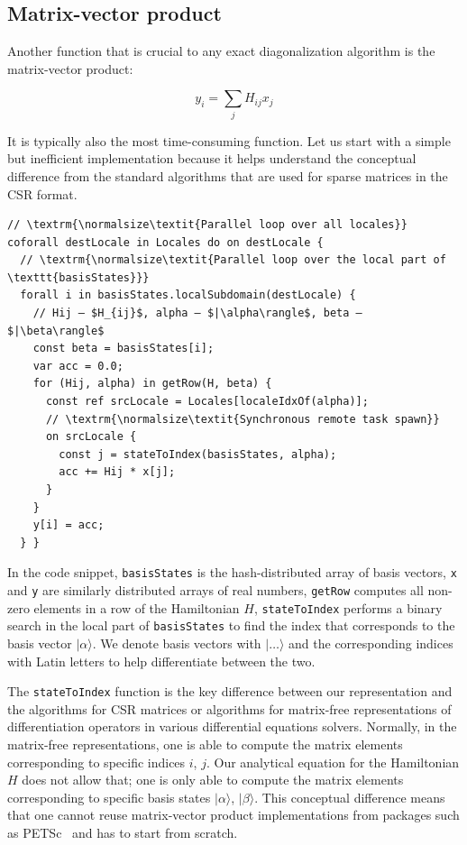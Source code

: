 \subsection{Matrix-vector product}\label{sec:ls23:matrix-vector-product}

Another function that is crucial to any exact diagonalization algorithm is the matrix-vector product:

\begin{equation*}
    y_i = \sum_{j} H_{ij} x_j
\end{equation*}

\noindent It is typically also the most time-consuming function. Let us start with a simple but inefficient implementation because it helps understand the conceptual difference from the standard algorithms that are used for sparse matrices in the CSR format.

\begin{verbatim}
// \textrm{\normalsize\textit{Parallel loop over all locales}}
coforall destLocale in Locales do on destLocale {
  // \textrm{\normalsize\textit{Parallel loop over the local part of \texttt{basisStates}}}
  forall i in basisStates.localSubdomain(destLocale) {
    // Hij — $H_{ij}$, alpha — $|\alpha\rangle$, beta — $|\beta\rangle$
    const beta = basisStates[i];
    var acc = 0.0;
    for (Hij, alpha) in getRow(H, beta) {
      const ref srcLocale = Locales[localeIdxOf(alpha)];
      // \textrm{\normalsize\textit{Synchronous remote task spawn}}
      on srcLocale {
        const j = stateToIndex(basisStates, alpha);
        acc += Hij * x[j];
      }
    }
    y[i] = acc;
  } }
\end{verbatim}

In the code snippet, \verb|basisStates| is the hash-distributed array of basis vectors, \verb|x| and \verb|y| are similarly distributed arrays of real numbers, \verb|getRow| computes all non-zero elements in a row of the Hamiltonian $H$, \verb|stateToIndex| performs a binary search in the local part of \verb|basisStates| to find the index that corresponds to the basis vector $|\alpha\rangle$. We denote basis vectors with $|\dots\rangle$ and the corresponding indices with Latin letters to help differentiate between the two.

The \verb|stateToIndex| function is the key difference between our representation and the algorithms for CSR matrices or algorithms for matrix-free representations of differentiation operators in various differential equations solvers. Normally, in the matrix-free representations, one is able to compute the matrix elements corresponding to specific indices $i$, $j$. Our analytical equation for the Hamiltonian $H$ does not allow that; one is only able to compute the matrix elements corresponding to specific basis states $|\alpha\rangle$, $|\beta\rangle$. This conceptual difference means that one cannot reuse matrix-vector product implementations from packages such as PETSc~\cite{Balay2023PetscWebPage} and has to start from scratch.

